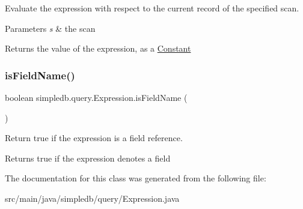 Evaluate the expression with respect to the current record of the specified scan. 
\begin{DoxyParams}{Parameters}
{\em s} & the scan \\
\hline
\end{DoxyParams}
\begin{DoxyReturn}{Returns}
the value of the expression, as a \hyperlink{classsimpledb_1_1query_1_1Constant}{Constant} 
\end{DoxyReturn}
\mbox{\label{classsimpledb_1_1query_1_1Expression_a9bbaeb4fd94c01671e8207ba95ddd808}} 
\subsubsection{\texorpdfstring{is\+Field\+Name()}{isFieldName()}}
{\footnotesize\ttfamily boolean simpledb.\+query.\+Expression.\+is\+Field\+Name (\begin{DoxyParamCaption}{ }\end{DoxyParamCaption})\hspace{0.3cm}{\ttfamily [inline]}}

Return true if the expression is a field reference. \begin{DoxyReturn}{Returns}
true if the expression denotes a field 
\end{DoxyReturn}


The documentation for this class was generated from the following file\+:\begin{DoxyCompactItemize}
\item 
src/main/java/simpledb/query/Expression.\+java\end{DoxyCompactItemize}
